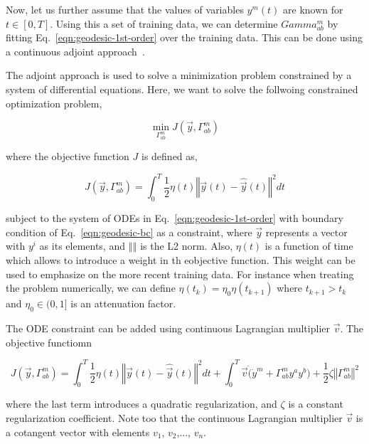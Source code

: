 \documentclass{article}
\begin{document}
Now, let us further assume that the values of variables $y^{m}(t)$ are
known for $t \in [0,T]$. Using this a set of training data, we can
determine $Gamma^{m}_{ab}$ by fitting Eq.~\ref{eqn:geodesic-1st-order}
over the training data. This can be done using a continuous adjoint
approach~\cite{ref:adjoint-giles}.

The adjoint approach is used to solve a minimization problem
constrained by a system of differential equations. Here, we want to
solve the follwoing constrained optimization problem,

\begin{equation}\label{eqn:optimization-problem}
\min_{\Gamma^{m}_{ab}} J(\vec{y},\Gamma^{m}_{ab})
\end{equation}

where the objective function $J$ is defined as,

\begin{equation}\label{eqn:optimization-objective-raw}
J(\vec{y},\Gamma^{m}_{ab}) = \int_{0}^{T} \frac{1}{2} \eta(t) \left\Vert
\vec{y}(t) - \hat{\vec{y}}(t) \right\Vert^{2} dt
\end{equation}

subject to the system of ODEs in Eq.~\ref{eqn:geodesic-1st-order} with
boundary condition of Eq.~\ref{eqn:geodesic-bc} as a constraint, where
$\vec{y}$ represents a vector with $y^{i}$ as its elements, and
$\left\Vert \right\Vert$ is the L2 norm. Also, $\eta(t)$ is a function
of time which allows to introduce a weight in th eobjective
function. This weight can be used to emphasize on the more recent
training data. For instance when treating the problem numerically, we
can define $\eta(t_{k}) = \eta_{0} \eta(t_{k+1})$ where $t_{k+1} >
t_{k}$ and $\eta_{0} \in (0,1]$ is an attenuation factor.

The ODE constraint can be added using continuous Lagrangian multiplier
$\vec{v}$. The objective functiomn

\begin{equation}\label{eqn:optimization-objective}
J(\vec{y},\Gamma^{m}_{ab}) = \int_{0}^{T} \frac{1}{2} \eta(t)
\left\Vert \vec{y}(t) - \hat{\vec{y}}(t) \right\Vert^{2} dt +
\int_{0}^{T} \vec{v} \dot ( \dot{y}^{m} + \Gamma^{m}_{ab} y^{a} y^{b}
) + \frac{1}{2} \zeta \left\Vert \Gamma^{m}_{ab} \right\Vert^{2}
\end{equation}

where the last term introduces a quadratic regularization, and $\zeta$
is a constant regularization coefficient. Note too that the continuous
Lagrangian multiplier $\vec{v}$ is a cotangent vector with elements
$v_{1}$, $v_{2}$,..., $v_{n}$.
\end{document}
